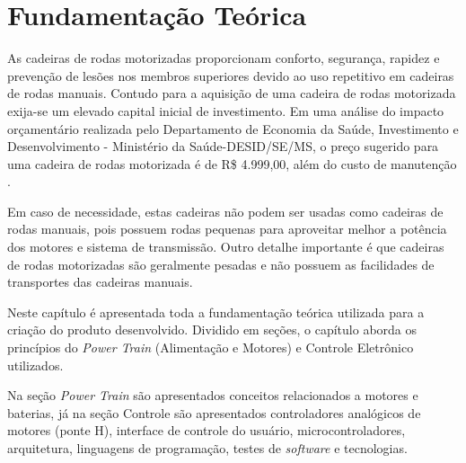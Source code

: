 \chapter{Fundamentação Teórica}
\label{cap:fundamentacao_teorica}

As cadeiras de rodas motorizadas proporcionam conforto, segurança, rapidez e prevenção de lesões nos membros superiores devido ao uso repetitivo em cadeiras de rodas manuais. Contudo para a aquisição de uma cadeira de rodas motorizada exija-se um elevado capital inicial de investimento. Em uma análise do impacto orçamentário realizada pelo Departamento de Economia da Saúde, Investimento e Desenvolvimento - Ministério da Saúde-DESID/SE/MS, o preço sugerido para uma cadeira de rodas motorizada é de R\$ 4.999,00, além do custo de manutenção \cite{relatorio_sus}.

Em caso de necessidade, estas cadeiras não podem ser usadas como cadeiras de rodas manuais, pois possuem rodas pequenas para aproveitar melhor a potência dos motores e sistema de transmissão. Outro detalhe importante é que cadeiras de rodas motorizadas são geralmente pesadas e não possuem as facilidades de transportes das cadeiras manuais.

Neste capítulo é apresentada toda a fundamentação teórica utilizada para a criação do produto desenvolvido. Dividido em seções, o capítulo aborda os princípios do \textit{Power Train} (Alimentação e Motores) e Controle Eletrônico utilizados.

Na seção \textit{Power Train} são apresentados conceitos relacionados a motores e baterias, já na seção Controle são apresentados controladores analógicos de motores (ponte H), interface de controle do usuário, microcontroladores, arquitetura, linguagens de programação, testes de \textit{software} e tecnologias.

